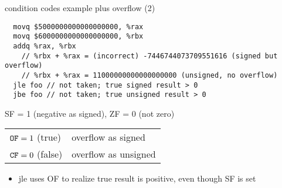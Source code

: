 \begin{frame}[fragile,label=ccExOF2]{condition codes example plus overflow (2)}
\begin{lstlisting}
  movq $5000000000000000000, %rax
  movq $6000000000000000000, %rbx
  addq %rax, %rbx
    // %rbx + %rax = (incorrect) -7446744073709551616 (signed but overflow)
    // %rbx + %rax = 11000000000000000000 (unsigned, no overflow)
  jle foo // not taken; true signed result > 0
  jbe foo // not taken; true unsigned result > 0
\end{lstlisting}
SF = 1 (negative as signed), ZF = 0 (not zero) \\
\begin{tabular}{ll}
$\mathtt{OF} = 1$ (true) & overflow as signed \\
$\mathtt{CF} = 0$ (false) & overflow as unsigned \\
\end{tabular}
\begin{itemize}
\item jle uses OF to realize true result is positive, even though SF is set
\end{itemize}
\end{frame}



